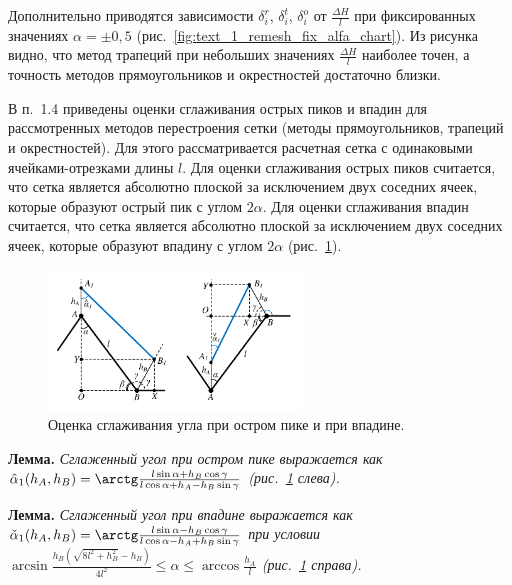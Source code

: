 \documentclass[a4paper,14pt]{extarticle}                     %
\theoremstyle{plain}                                         %
\begin{document}
Дополнительно приводятся зависимости $\delta_i^r$, $\delta_i^t$, $\delta_i^o$ от $\frac{\Delta H}{l}$ при фиксированных значениях $\alpha = \pm 0,5$ (рис.~\ref{fig:text_1_remesh_fix_alfa_chart}).
Из рисунка видно, что метод трапеций при небольших значениях $\frac{\Delta H}{l}$ наиболее точен, а точность методов прямоугольников и окрестностей достаточно близки.


В п.~1.4 приведены оценки сглаживания острых пиков и впадин для рассмотренных методов перестроения сетки (методы прямоугольников, трапеций и окрестностей).
Для этого рассматривается расчетная сетка с одинаковыми ячейками-отрезками длины $l$.
Для оценки сглаживания острых пиков считается, что сетка является абсолютно плоской за исключением двух соседних ячеек, которые образуют острый пик с углом $2 \alpha$.
Для оценки сглаживания впадин считается, что сетка является абсолютно плоской за исключением двух соседних ячеек, которые образуют впадину с углом $2 \alpha$ (рис.~\ref{fig:text_1_remesh_2d_peak_cavern_general}).

\begin{figure}[ht]
\centering
\includegraphics[width=0.6\textwidth]{./pics/text_1_remesh_2d/peak-cavern-general.pdf}
\singlespacing
\caption{Оценка сглаживания угла при остром пике и при впадине.}
\label{fig:text_1_remesh_2d_peak_cavern_general}
\end{figure}

\textbf{Лемма.} \textit{Сглаженный угол при остром пике выражается как $\hat{\alpha}_1(h_A, h_B) = \arctg \frac{l \sin \alpha + h_B \cos \gamma}{l \cos \alpha + h_A - h_B \sin \gamma}$ (рис.~\ref{fig:text_1_remesh_2d_peak_cavern_general} слева).}

\textbf{Лемма.} \textit{Сглаженный угол при впадине выражается как $\check{\alpha}_1(h_A, h_B) = \arctg \frac{l \sin \alpha - h_B \cos \gamma}{l \cos \alpha - h_A + h_B \sin \gamma}$ при условии $\arcsin \frac{h_B \left( \sqrt{8 l^2 + h_B^2} - h_B \right)}{4 l^2} \le \alpha \le \arccos \frac{h_A}{l}$ (рис.~\ref{fig:text_1_remesh_2d_peak_cavern_general} справа).}
\end{document}
